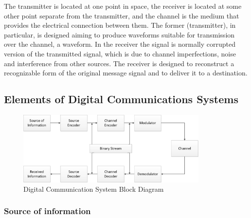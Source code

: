 The transmitter is located at one point in space, the receiver is located at
some other point separate from the transmitter, and the channel is the medium
that provides the electrical connection between them. The former (transmitter),
in particular, is designed aiming to produce waveforms suitable for transmission
over the channel, a waveform. In the receiver the signal is normally corrupted
version of the transmitted signal, which is due to channel imperfections, noise
and interference from other sources. The receiver is designed to reconstruct a
recognizable form of the original message signal and to deliver it to a
destination.

%
%
%
%
%

\subsection{Elements of Digital Communications Systems}

\begin{figure}[htbp]
    \centering
    \includegraphics[width=0.85\textwidth]{./figures/digicom_bd}
    \caption{ Digital Communication System Block Diagram
    \label{fig:digcombd}}
\end{figure}

\subsubsection{Source of information}


